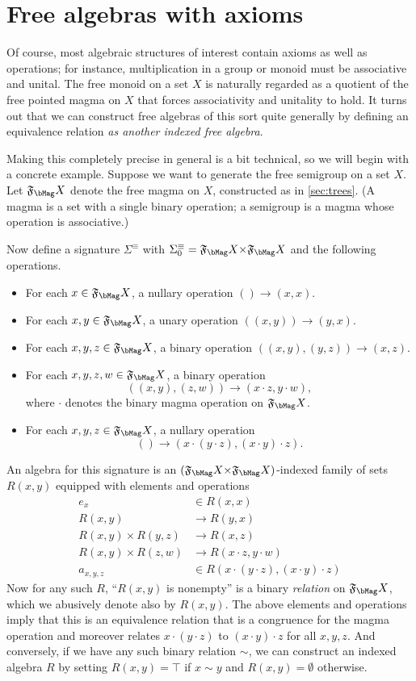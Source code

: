 \documentclass{book}
\def\sig{\Sigma}
\def\equivsym{\mathord{\equiv}}
\newcommand{\F}[1]{\mathfrak{F}_{#1}}
\def\unit{\top}%
\begin{document}
\section{Free algebras with axioms}
\label{sec:axioms}

Of course, most algebraic structures of interest contain axioms as well as operations; for instance, multiplication in a group or monoid must be associative and unital.
The free monoid on a set $X$ is naturally regarded as a quotient of the free pointed magma on $X$ that forces associativity and unitality to hold.
It turns out that we can construct free algebras of this sort quite generally by defining an equivalence relation \emph{as another indexed free algebra}.

Making this completely precise in general is a bit technical, so we will begin with a concrete example.
Suppose we want to generate the free semigroup on a set $X$.
Let $\F\bMag X$ denote the free magma on $X$, constructed as in \cref{sec:trees}.
(A magma is a set with a single binary operation; a semigroup is a magma whose operation is associative.)

Now define a signature $\sig^{\equivsym}$ with $\sig^{\equivsym}_0 = \F\bMag X\times \F\bMag X$ and the following operations.
\begin{itemize}
\item For each $x\in \F\bMag X$, a nullary operation $() \to (x,x)$.
\item For each $x,y\in \F\bMag X$, a unary operation $((x,y)) \to (y,x)$.
\item For each $x,y,z\in \F\bMag X$, a binary operation $((x,y),(y,z)) \to (x,z)$.
\item For each $x,y,z,w\in \F\bMag X$, a binary operation \[((x,y),(z,w)) \to (x\cdot z,y\cdot w),\] where $\cdot$ denotes the binary magma operation on $\F\bMag X$.
\item For each $x,y,z\in \F\bMag X$, a nullary operation \[() \to (x\cdot (y\cdot z),(x\cdot y)\cdot z).\]
\end{itemize}
An algebra for this signature is an $(\F\bMag X\times \F\bMag X)$-indexed family of sets $R(x,y)$ equipped with elements and operations
\begin{align*}
  e_x &\in R(x,x)\\
  R(x,y) &\to R(y,x)\\
  R(x,y)\times R(y,z) &\to R(x,z)\\
  R(x,y) \times R(z,w) &\to R(x\cdot z,y\cdot w)\\
  a_{x,y,z} &\in R(x\cdot (y\cdot z),(x\cdot y)\cdot z)
\end{align*}
Now for any such $R$, ``$R(x,y)$ is nonempty'' is a binary \emph{relation} on $\F\bMag X$, which we abusively denote also by $R(x,y)$.
The above elements and operations imply that this is an equivalence relation that is a congruence for the magma operation and moreover relates $x\cdot (y\cdot z)$ to $(x\cdot y)\cdot z$ for all $x,y,z$.
And conversely, if we have any such binary relation $\sim$, we can construct an indexed algebra $R$ by setting $R(x,y) = \unit$ if $x\sim y$ and $R(x,y)=\emptyset$ otherwise.
\end{document}
